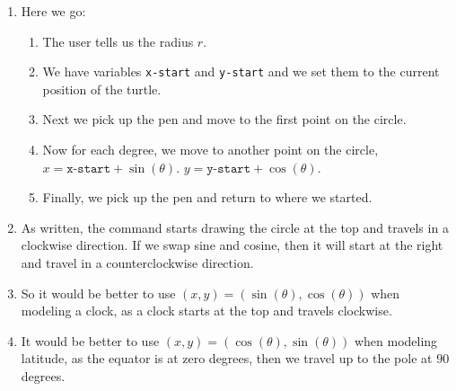 \documentclass[noauthor,nooutcomes,handout]{ximera}
\begin{document}
\begin{question}
\begin{enumerate}
  \end{enumerate}
  \begin{freeResponse}
    \begin{enumerate}
    \item Here we go:
      \begin{enumerate}
      \item The user tells us the radius $r$.
      \item We have variables \texttt{x-start} and \texttt{y-start}
        and we set them to the current position of the turtle.
      \item Next we pick up the pen and move to the first point on the circle.
      \item Now for each degree, we move to another point on the circle, $x= \texttt{x-start} + \sin(\theta)$. $y= \texttt{y-start} + \cos(\theta)$. 
      \item Finally, we pick up the pen and return to where we started.
      \end{enumerate}
    \item As written, the command starts drawing the circle at the top
      and travels in a clockwise direction. If we swap sine and
      cosine, then it will start at the right and travel in a
      counterclockwise direction.
    \item So it would be better to use $(x,y) =
      (\sin(\theta),\cos(\theta))$ when modeling a clock, as a clock starts at the top and travels clockwise.
    \item It would be better to use $(x,y) =
      (\cos(\theta),\sin(\theta))$ when modeling latitude, as the
      equator is at zero degrees, then we travel up to the pole at
      $90$ degrees.
    \end{enumerate}
  \end{freeResponse}
\end{question}
\mynewpage
\end{document}

